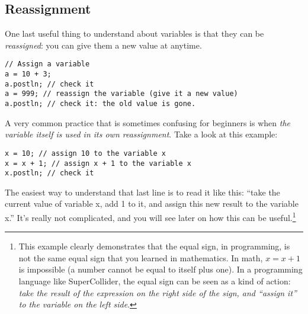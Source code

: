 \subsection{Reassignment}

One last useful thing to understand about variables is that they can be \emph{reassigned}: you can give them a new value at anytime.

\begin{lstlisting}[style=SuperCollider-IDE, basicstyle=\scttfamily\footnotesize]
// Assign a variable
a = 10 + 3;
a.postln; // check it
a = 999; // reassign the variable (give it a new value)
a.postln; // check it: the old value is gone.
\end{lstlisting}

A very common practice that is sometimes confusing for beginners is when \emph{the variable itself is used in its own reassignment}. Take a look at this example:

\begin{lstlisting}[style=SuperCollider-IDE, basicstyle=\scttfamily\footnotesize]
x = 10; // assign 10 to the variable x
x = x + 1; // assign x + 1 to the variable x
x.postln; // check it
\end{lstlisting}

The easiest way to understand that last line is to read it like this: ``take the current value of variable x, add 1 to it, and assign this new result to the variable x.'' It's really not complicated, and you will see later on how this can be useful.\footnote{This example clearly demonstrates that the equal sign, in programming, is not the same equal sign that you learned in mathematics. In math, $x = x + 1$ is impossible (a number cannot be equal to itself plus one). In a programming language like SuperCollider, the equal sign can be seen as a kind of action: \emph{take the result of the expression on the right side of the sign, and ``assign it'' to the variable on the left side}.}